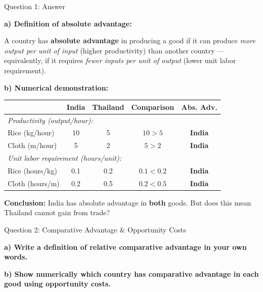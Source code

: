 \documentclass{beamer}
\begin{document}
\begin{frame}{Question 1: Answer}

\textbf{a) Definition of absolute advantage:}

\vspace{0.2cm}

A country has \textbf{absolute advantage} in producing a good if it can produce \textit{more output per unit of input} (higher productivity) than another country --- equivalently, if it requires \textit{fewer inputs per unit of output} (lower unit labor requirement).

\vspace{0.2cm}

\textbf{b) Numerical demonstration:}
\vspace{-0.2cm}
\begin{center}
\small
\begin{tabular}{lcccc}
\toprule
& \textbf{India} & \textbf{Thailand} & \textbf{Comparison} & \textbf{Abs. Adv.} \\
\midrule
\multicolumn{5}{l}{\textit{Productivity (output/hour):}} \\
Rice (kg/hour) & 10 & 5 & $10 > 5$ & \textcolor{homecolor}{\textbf{India}} \\
Cloth (m/hour) & 5 & 2 & $5 > 2$ & \textcolor{homecolor}{\textbf{India}} \\
\midrule
\multicolumn{5}{l}{\textit{Unit labor requirement (hours/unit):}} \\
Rice (hours/kg) & 0.1 & 0.2 & $0.1 < 0.2$ & \textcolor{homecolor}{\textbf{India}} \\
Cloth (hours/m) & 0.2 & 0.5 & $0.2 < 0.5$ & \textcolor{homecolor}{\textbf{India}} \\
\bottomrule
\end{tabular}
\end{center}

\vspace{0.2cm}

\textbf{Conclusion:} India has absolute advantage in \textbf{both} goods. But does this mean Thailand cannot gain from trade?

\end{frame}


\begin{frame}{Question 2: Comparative Advantage \& Opportunity Costs}

\textbf{a) Write a definition of relative comparative advantage in your own words.}

\vspace{0.5cm}

\textbf{b) Show numerically which country has comparative advantage in each good using opportunity costs.}

\end{frame}
\end{document}
